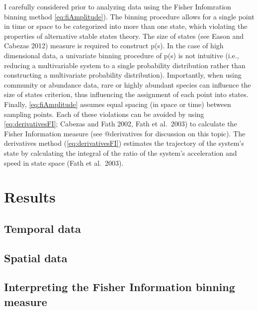 \documentclass[12pt,twoside]{reedthesis}
\begin{document}
I carefully considered prior to analyzing data using the Fisher Infomration binning method \eqref{eq:fiAmplitude}). The binning procedure allows for a single point in time or space to be categorized into more than one state, which violating the properties of alternative stable states theory. The size of states (see Eason and Cabezas 2012) measure is required to construct p(s). In the case of high dimensional data, a univariate binning procedure of p(s) is not intuitive (i.e., reducing a multivariable system to a single probability distribution rather than constructing a multivariate probability distribution). Importantly, when using community or abundance data, rare or highly abundant species can influence the size of states criterion, thus influencing the assignment of each point into states. Finally, \eqref{eq:fiAmplitude} assumes equal spacing (in space or time) between sampling points. Each of these violations can be avoided by using \eqref{eq:derivativesFI}; Cabezas and Fath 2002, Fath et al.~2003) to calculate the Fisher Information measure (see @derivatives for discussion on this topic). The derivatives method (\eqref{eq:derivativesFI}) estimates the trajectory of the system's state by calculating the integral of the ratio of the system's acceleration and speed in state space (Fath et al.~2003).

\hypertarget{results-1}{%
\section{Results}\label{results-1}}

\hypertarget{temporal-data}{%
\subsection{Temporal data}\label{temporal-data}}

\hypertarget{spatial-data}{%
\subsection{Spatial data}\label{spatial-data}}

\hypertarget{interpreting-the-fisher-information-binning-measure}{%
\subsection{Interpreting the Fisher Information binning measure}\label{interpreting-the-fisher-information-binning-measure}}
\end{document}
